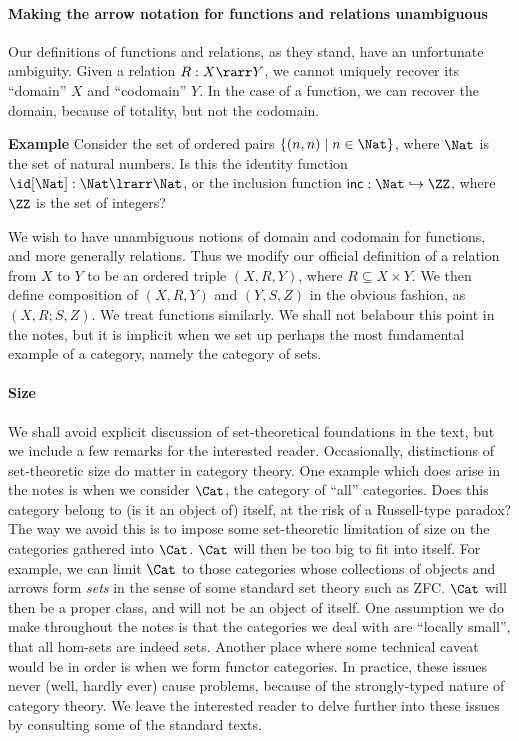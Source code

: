 \documentclass{svmult}
\begin{document}
\paragraph{Making the arrow notation for functions and relations unambiguous}
Our definitions of functions and relations, as they stand, have an unfortunate ambiguity. Given a relation $R : X \rarr Y$, we cannot uniquely recover its ``domain'' $X$ and ``codomain'' $Y$. In the case of a function, we can recover the domain, because of totality, but not the codomain.

\noindent \textbf{Example} Consider the set of ordered pairs $\{ (n, n) \mid n \in \Nat \}$, where $\Nat$ is the set of natural numbers. Is this the identity function $\id[\Nat] : \Nat \lrarr \Nat$, or the inclusion function $\mathsf{inc} : \Nat \hookrightarrow \ZZ$, where $\ZZ$ is the set of integers?

We wish to have unambiguous notions of domain and codomain for functions, and more generally relations. Thus we modify our official definition of a relation from $X$ to $Y$ to be an ordered triple $(X, R, Y)$, where $R \subseteq X \times Y$. We then define composition of $(X, R, Y)$ and $(Y, S, Z)$ in the obvious fashion, as $(X, R;S, Z)$. We treat functions similarly. We shall not belabour this point in the notes, but it is implicit when we set up perhaps the most fundamental example of a category, namely the category of sets.

\paragraph{Size} We shall avoid explicit discussion of set-theoretical foundations in the text, but we include a few remarks for the interested reader. Occasionally, distinctions of set-theoretic size do matter in category theory. One example which does arise in the notes is when we consider $\Cat$, the category of ``all'' categories. Does this category belong to (is it an object of) itself, at the risk of a Russell-type paradox? The way we avoid this is to impose some set-theoretic limitation of size on the categories gathered into $\Cat$. $\Cat$  will then be too big to fit into itself. For example, we can limit $\Cat$ to those categories whose collections of objects and arrows form \emph{sets} in the sense of some standard set theory such as ZFC. $\Cat$ will then be a proper class, and will not be an object of itself.
One assumption we do make throughout the notes is that the categories we deal with are ``locally small'', \ie that all hom-sets are indeed sets. Another place where some technical caveat would be in order is when we form functor categories. In practice, these issues never (well, hardly ever) cause problems, because of the strongly-typed nature of category theory. We leave the interested reader to delve further into these issues by consulting some of the standard texts.
\end{document}
